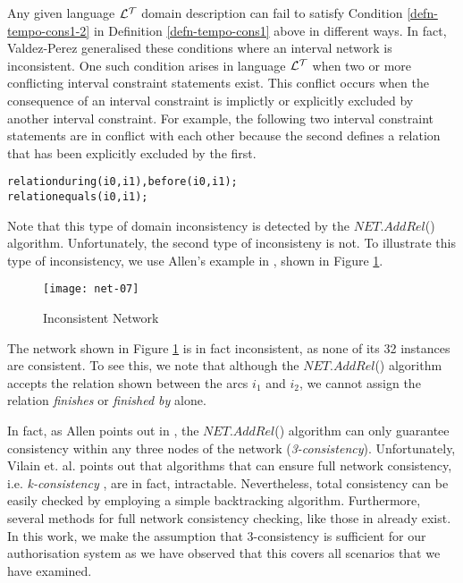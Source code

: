 \documentclass[11pt]{report}
\newenvironment{vverbatim}
{
  \begin{alltt}
}
{
    \vspace{-\baselineskip}
  \end{alltt}
}
\begin{document}
      Any given language ${\cal L^T}$ domain description can fail to satisfy
      Condition \ref{defn-tempo-cons1-2} in Definition \ref{defn-tempo-cons1}
      above in different ways. In fact, Valdez-Perez \cite{VAL} generalised
      these conditions where an interval network is inconsistent\footnotemark.
      One such condition arises in language ${\cal L^T}$ when two or more
      conflicting interval constraint statements exist. This conflict occurs
      when the consequence of an interval constraint is implictly or explicitly
      excluded by another interval constraint. For example, the following two
      interval constraint statements are in conflict with each other because
      the second defines a relation that has been explicitly excluded by the
      first.

      \begin{vverbatim}
  relation during(i0, i1), before(i0, i1);
  relation equals(i0, i1);
      \end{vverbatim}

      Note that this type of domain inconsistency is detected by the
      $NET.AddRel$() algorithm. Unfortunately, the second type of inconsisteny
      is not. To illustrate this type of inconsistency, we use Allen's example
      in \cite{ALE}, shown in Figure \ref{figu-tempo-ntwk7}.

      \begin{figure}[tbhp]
        \begin{center}
          \texttt{[image: net-07]}
          \caption{Inconsistent Network}
          \label{figu-tempo-ntwk7}
        \end{center}
      \end{figure}

      The network shown in Figure \ref{figu-tempo-ntwk7} is in fact
      inconsistent, as none of its 32 instances are consistent. To see this, we
      note that although the $NET.AddRel$() algorithm accepts the relation
      shown between the arcs $i_1$ and $i_2$, we cannot assign the relation
      {\em finishes} or {\em finished by} alone.

      In fact, as Allen points out in \cite{ALE}, the $NET.AddRel$() algorithm
      can only guarantee consistency within any three nodes of the network
      ({\em 3-consistency}). Unfortunately, Vilain et. al. \cite{VIL} points
      out that algorithms that can ensure full network consistency, i.e.
      {\em k-consistency} \cite{FRE}, are in fact, intractable. Nevertheless,
      total consistency can be easily checked by employing a simple
      backtracking algorithm. Furthermore, several methods for full network
      consistency checking, like those in \cite{LAD,VAN2} already exist. In
      this work, we make the assumption that 3-consistency is sufficient for
      our authorisation system as we have observed that this covers all
      scenarios that we have examined.
\end{document}
